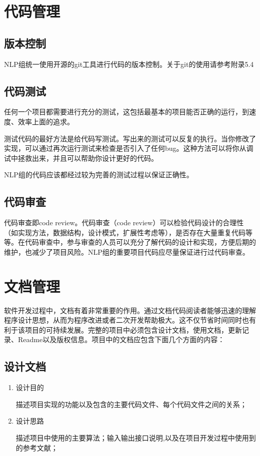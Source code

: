 \section{代码管理}

\subsection{版本控制}

NLP组统一使用开源的git工具进行代码的版本控制。关于git的使用请参考附录5.4

\subsection{代码测试}

任何一个项目都需要进行充分的测试，这包括最基本的项目能否正确的运行，到速度、效率上面的追求。

测试代码的最好方法是给代码写测试。写出来的测试可以反复的执行。当你修改了实现，可以通过再次运行测试来检查是否引入了任何bug。这种方法可以将你从调试中拯救出来，并且可以帮助你设计更好的代码。

NLP组的代码应该都经过较为完善的测试过程以保证正确性。

\subsection{代码审查}

代码审查即code review。代码审查（code review）可以检验代码设计的合理性（如实现方法，数据结构，设计模式，扩展性考虑等），是否存在大量重复代码等等。在代码审查中，参与审查的人员可以充分了解代码的设计和实现，方便后期的维护，也减少了项目风险。NLP组的重要项目代码应尽量保证进行过代码审查。

\section{文档管理}

软件开发过程中，文档有着非常重要的作用。通过文档代码阅读者能够迅速的理解程序设计思想，从而为程序改进或者二次开发帮助极大。这不仅节省时间同时也有利于该项目的可持续发展。完整的项目中必须包含设计文档，使用文档，更新记录、Readme以及版权信息。项目中的文档应包含下面几个方面的内容：

\subsection{设计文档}

\begin{enumerate}
\item 设计目的

描述项目实现的功能以及包含的主要代码文件、每个代码文件之间的关系；
\item 设计思路

描述项目中使用的主要算法；输入输出接口说明,以及在项目开发过程中使用到的参考文献；
\end{enumerate}

